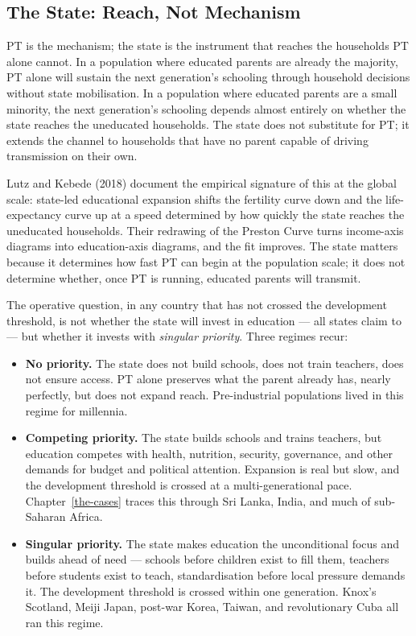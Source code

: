 \documentclass[12pt,letterpaper]{article}
\begin{document}
\subsection{The State: Reach, Not Mechanism}\label{the-state-reach-not-mechanism}

PT is the mechanism; the state is the instrument that reaches the
households PT alone cannot. In a population where educated parents
are already the majority, PT alone will sustain the next generation's
schooling through household decisions without state mobilisation. In
a population where educated parents are a small minority, the next
generation's schooling depends almost entirely on whether the state
reaches the uneducated households. The state does not substitute for
PT; it extends the channel to households that have no parent capable
of driving transmission on their own.

Lutz and Kebede (2018) document the empirical signature of this at
the global scale: state-led educational expansion shifts the
fertility curve down and the life-expectancy curve up at a speed
determined by how quickly the state reaches the uneducated
households. Their redrawing of the Preston Curve turns income-axis
diagrams into education-axis diagrams, and the fit improves. The
state matters because it determines how fast PT can begin at the
population scale; it does not determine whether, once PT is running,
educated parents will transmit.

The operative question, in any country that has not crossed the
development threshold, is not whether the state will invest in
education --- all states claim to --- but whether it invests with
\emph{singular priority}. Three regimes recur:

\begin{itemize}
\item \textbf{No priority.} The state does not build schools, does
not train teachers, does not ensure access. PT alone preserves what
the parent already has, nearly perfectly, but does not expand reach.
Pre-industrial populations lived in this regime for millennia.

\item \textbf{Competing priority.} The state builds schools and
trains teachers, but education competes with health, nutrition,
security, governance, and other demands for budget and political
attention. Expansion is real but slow, and the development threshold
is crossed at a multi-generational pace.
Chapter~\ref{the-cases} traces this through Sri Lanka, India, and
much of sub-Saharan Africa.

\item \textbf{Singular priority.} The state makes education the
unconditional focus and builds ahead of need --- schools before
children exist to fill them, teachers before students exist to teach,
standardisation before local pressure demands it. The development
threshold is crossed within one generation. Knox's Scotland, Meiji
Japan, post-war Korea, Taiwan, and revolutionary Cuba all ran this
regime.
\end{itemize}
\end{document}
